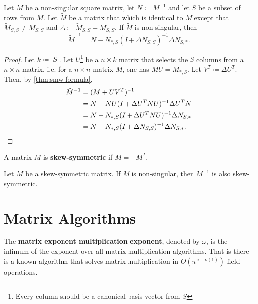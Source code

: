 \begin{corollary}
    \label{cor:update_cor} 
    Let \(M\) be a non-singular square matrix, let \(N \coloneqq M^{-1}\) and let \(S\) be a subset of rows from \(M\).
    Let \(\tilde{M}\) be a matrix that which is identical to \(M\) except that \(\tilde{M}_{S, S} \neq M_{S, S}\)
    and \(\Delta \coloneqq \tilde{M}_{S, S} - M_{S, S}\).
    If \(\tilde{M}\) is non-singular, then
    \[
        \tilde{M}^{-1} = N - N_{*, S}(I + \Delta N_{S, S})^{-1}\Delta N_{S, *}.
    \]
\end{corollary}

\begin{proof}
    Let \(k \coloneqq |S|\). 
    Let \(U\)\footnote{Every column should be a canonical basis vector from \(S\)} be a \(n \times k\) matrix that selects the \(S\) columns from a \(n \times n\) matrix, i.e.
    for a \(n \times n\) matrix \(M\), one has \(MU = M_{*, S}\). Let \(V^T \coloneqq \Delta U^T\). 
    Then, by \cref{thm:smw-formula}, 
    \begin{align*}
        \tilde{M}^{-1} &= (M + U V^T)^{-1} \\
        &= N - N U (I + \Delta U^T N U)^{-1} \Delta U^T N \\
        &= N - N_{*, S} (I + \Delta U^T N U)^{-1} \Delta N_{S, *} \\
        &= N - N_{*, S} (I + \Delta N_{S, S})^{-1} \Delta N_{S, *}. \qedhere
    \end{align*}
\end{proof}

\begin{definition}
\label{def:skew}
    A matrix \(M\) is \textbf{skew-symmetric} if \(M = -M^{T}\).
\end{definition}

\begin{fact}
    Let \(M\) be a skew-symmetric matrix.
    If \(M\) is non-singular, then \(M^{-1}\) is also skew-symmetric.
\end{fact}

\section{Matrix Algorithms}
\label{matrix:time_complexity}


\begin{definition}
  The \textbf{matrix exponent multiplication exponent}, denoted by \(\omega\), is the infimum of the exponent over all matrix multiplication algorithms.
  That is there is a known algorithm that solves matrix multiplication in \(O(n^{\omega + o(1)})\) field operations.
\end{definition}

